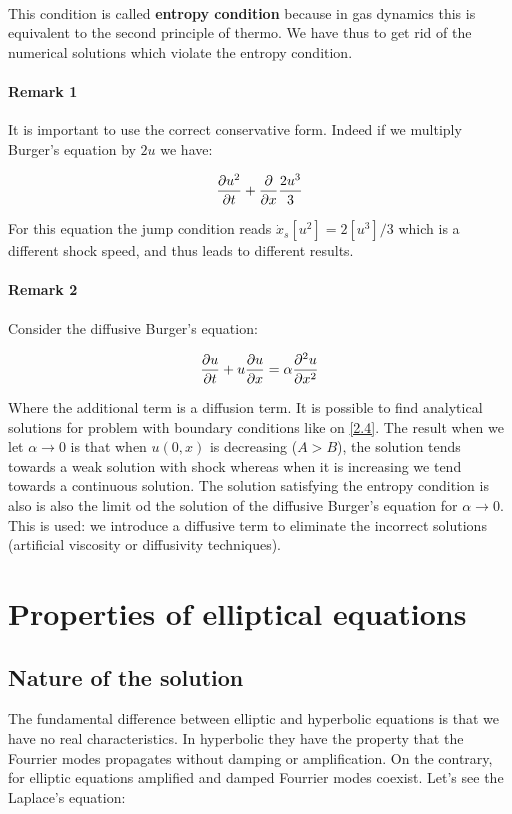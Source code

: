 \ \\

This condition is called \textbf{entropy condition} because in gas dynamics this is equivalent to the second principle of thermo. We have thus to get rid of the numerical solutions which violate the entropy condition. 

\paragraph{Remark 1} It is important to use the correct conservative form. Indeed if we multiply Burger's equation by $2u$ we have: 

\begin{equation}
\frac{\partial u^2}{\partial t} + \frac{\partial }{\partial x} \frac{2u^3}{3}
\end{equation}

For this equation the jump condition reads $\dot{x}_s[u^2]= 2[u^3]/3$ which is a different shock speed, and thus leads to different results. 

\paragraph{Remark 2} Consider the diffusive Burger's equation: 

\begin{equation}
\frac{\partial u}{\partial t} + u \frac{\partial u}{\partial x} = \alpha \frac{\partial ^2 u}{\partial x^2}
\end{equation}

Where the additional term is a diffusion term. It is possible to find analytical solutions for problem with boundary conditions like on \autoref{2.4}. The result when we let $\alpha \rightarrow 0$ is that when $u(0,x)$ is decreasing ($A>B$), the solution tends towards a weak solution with shock whereas when it is increasing we tend towards a continuous solution. The solution satisfying the entropy condition is also is also the limit od the solution of the diffusive Burger's equation for $\alpha \rightarrow 0$. This is used: we introduce a diffusive term to eliminate the incorrect solutions (artificial viscosity or diffusivity techniques). 

\section{Properties of elliptical equations}
\subsection{Nature of the solution}
The fundamental difference between elliptic and hyperbolic equations is that we have no real characteristics. In hyperbolic they have the property that the Fourrier modes propagates without damping or amplification. On the contrary, for elliptic equations amplified and damped Fourrier modes coexist. Let's see the Laplace's equation:

